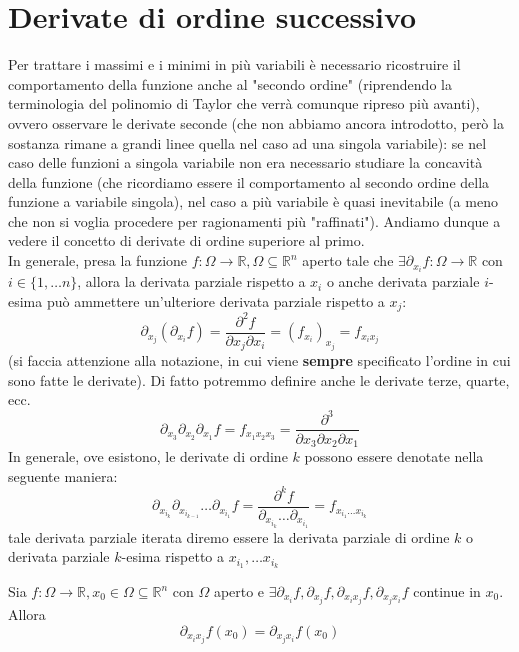 \documentclass[openany, italian]{book}
\begin{document}
\section{Derivate di ordine successivo}
Per trattare i massimi e i minimi in più variabili è necessario ricostruire il comportamento della funzione anche al "secondo ordine" (riprendendo la terminologia del polinomio di Taylor che verrà comunque ripreso più avanti), ovvero osservare le derivate seconde (che non abbiamo ancora introdotto, però la sostanza rimane a grandi linee quella nel caso ad una singola variabile): se nel caso delle funzioni a singola variabile non era necessario studiare la concavità della funzione (che ricordiamo essere il comportamento al secondo ordine della funzione a variabile singola), nel caso a più variabile è quasi inevitabile (a meno che non si voglia procedere per ragionamenti più "raffinati"). Andiamo dunque a vedere il concetto di derivate di ordine superiore al primo. \\
In generale, presa la funzione $f: \Omega \to \mathbb{R}, \Omega \subseteq \mathbb{R}^n$ aperto tale che $\exists \partial_{x_i}f: \Omega \to \mathbb{R}$ con $i \in \{ 1, \ldots n \}$, allora la derivata parziale rispetto a $x_i$ o anche derivata parziale $i$-esima può ammettere un'ulteriore derivata parziale rispetto a $x_j$:
$$
\partial_{x_j}(\partial_{x_i} f) = \frac{\partial^2 f}{\partial x_j \partial x_i} = (f_{x_i})_{x_j} = f_{x_i x_j}
$$
(si faccia attenzione alla notazione, in cui viene \textbf{sempre} specificato l'ordine in cui sono fatte le derivate). Di fatto potremmo definire anche le derivate terze, quarte, ecc.
$$
\partial_{x_3} \partial_{x_2} \partial_{x_1} f = f_{x_1 x_2 x_3} = \frac{\partial^3}{\partial x_3 \partial x_2 \partial x_1}
$$
In generale, ove esistono, le derivate di ordine $k$ possono essere denotate nella seguente maniera:
$$
\partial_{x_{i_k}} \partial_{x_{i_{k-1}}} \ldots \partial_{x_{i_1}} f = \frac{\partial^k f}{\partial_{x_{i_k}} \ldots \partial_{x_{i_1}}} = f_{x_{i_1} \ldots x_{i_k}}
$$
tale derivata parziale iterata diremo essere la derivata parziale di ordine $k$ o derivata parziale $k$-esima rispetto a $x_{i_1}, \ldots x_{i_k}$
\begin{theorem}[di Schwarz]
Sia $f:\Omega \to \mathbb{R}, x_0 \in \Omega \subseteq \mathbb{R}^n$ con $\Omega$ aperto e $\exists \partial_{x_i} f, \partial_{x_j} f, \partial_{x_i x_j} f, \partial_{x_j x_i} f$ continue in $x_0$. Allora
$$
\partial_{x_i x_j} f(x_0) = \partial_{x_j x_i} f(x_0)
$$
\end{theorem}
\end{document}

